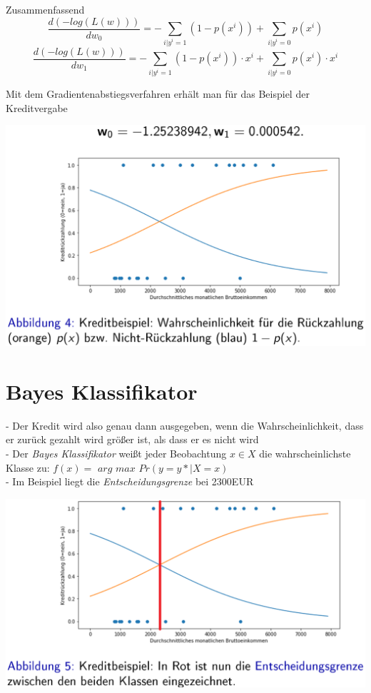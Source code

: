 \documentclass{report}
\begin{document}
Zusammenfassend
$$\frac{d(-log(L(w)))}{dw_0} = -\sum_{i|y^i = 1}(1 - p(x^i)) + \sum_{i | y^i = 0}p(x^i)$$
$$\frac{d(-log(L(w)))}{dw_1} = -\sum_{i|y^i = 1}(1 - p(x^i))\cdot x^i + \sum_{i|y^i = 0}p(x^i)\cdot x^i$$

Mit dem Gradientenabstiegsverfahren erhält man für das Beispiel der Kreditvergabe
\begin{center}
  \includegraphics[scale=.25]{ml03_3}
\end{center}

\section{Bayes Klassifikator}
- Der Kredit wird also genau dann ausgegeben, wenn die Wahrscheinlichkeit, dass er zurück gezahlt wird größer ist, als dass er es nicht wird\\
- Der \textit{Bayes Klassifikator} weißt jeder Beobachtung $x \in X$ die wahrscheinlichste Klasse zu: $f(x) =$ $arg$ $max$ $Pr(y = y* | X = x)$\\
- Im Beispiel liegt die \textit{Entscheidungsgrenze} bei 2300EUR
\begin{center}
  \includegraphics[scale=.25]{ml03_4}
\end{center}
\end{document}
